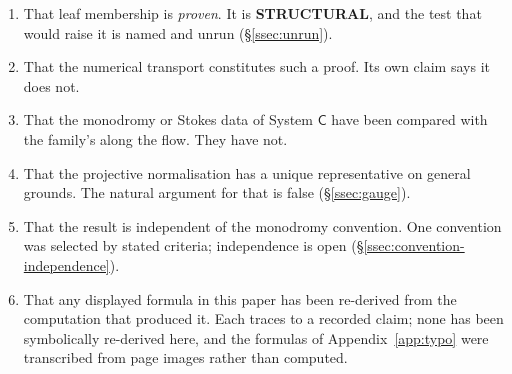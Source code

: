 \begin{enumerate}
\item That leaf membership is \emph{proven}. It is \textbf{STRUCTURAL}, and the
  test that would raise it is named and unrun (\S\ref{ssec:unrun}).
\item That the numerical transport constitutes such a proof. Its own claim says
  it does not.
\item That the monodromy or Stokes data of System $\mathsf C$ have been
  compared with the family's along the flow. They have not.
\item That the projective normalisation has a unique representative on general
  grounds. The natural argument for that is false
  (\S\ref{ssec:gauge}).
\item That the result is independent of the monodromy convention. One
  convention was selected by stated criteria; independence is open
  (\S\ref{ssec:convention-independence}).
\item That any displayed formula in this paper has been re-derived from the
  computation that produced it. Each traces to a recorded claim; none has been
  symbolically re-derived here, and the formulas of
  Appendix~\ref{app:typo} were transcribed from page images rather than
  computed.
\end{enumerate}

